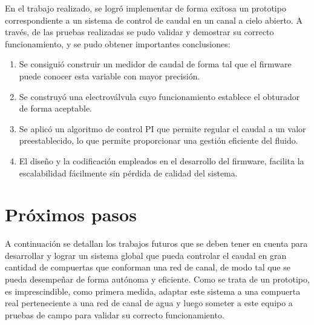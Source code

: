 %
En el trabajo realizado, se logró implementar de forma exitosa un prototipo correspondiente a un sistema de control de caudal en un canal a cielo abierto.
A través, de las pruebas realizadas se pudo validar y demostrar su correcto funcionamiento, y se pudo obtener importantes conclusiones:
\begin{enumerate}
\item Se consiguió construir un medidor de caudal de forma tal que el firmware puede conocer esta variable con mayor precisión.
\item Se construyó una electroválvula cuyo funcionamiento establece el obturador de forma aceptable.      
\item Se aplicó un algoritmo de control PI que permite regular el caudal a un valor preestablecido, lo que permite proporcionar una gestión eficiente del fluido. 
\item El diseño y la codificación empleados en el desarrollo del firmware, facilita la escalabilidad fácilmente sin pérdida de calidad del sistema.

\end{enumerate}
\section{Próximos pasos}

A continuación se detallan los trabajos futuros que se deben tener en cuenta para desarrollar y lograr un sistema global que pueda controlar el caudal en gran cantidad de compuertas que conforman una red de canal, de modo tal que se pueda desempeñar de forma autónoma y eficiente. 
Como se trata de un prototipo, es imprescindible, como primera medida, adaptar este sistema a una compuerta real perteneciente a una red de canal de agua y luego someter a este equipo a pruebas de campo para validar su correcto funcionamiento.


